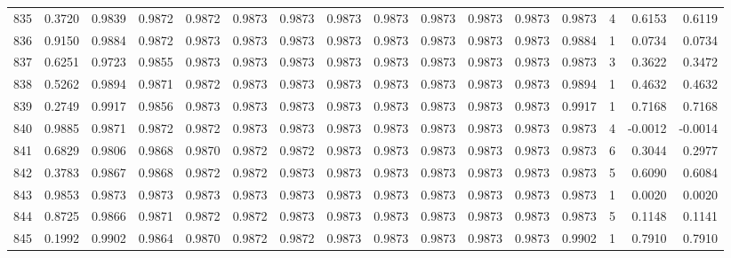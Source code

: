 \begin{tabular}{lrrrrrrrrrrrrrrr}
835 &      0.3720 &  0.9839 &  0.9872 &  0.9872 &  0.9873 &  0.9873 &  0.9873 &  0.9873 &  0.9873 &  0.9873 &   0.9873 &     0.9873 &      4 &                    0.6153 &                     0.6119 \\
836 &      0.9150 &  0.9884 &  0.9872 &  0.9873 &  0.9873 &  0.9873 &  0.9873 &  0.9873 &  0.9873 &  0.9873 &   0.9873 &     0.9884 &      1 &                    0.0734 &                     0.0734 \\
837 &      0.6251 &  0.9723 &  0.9855 &  0.9873 &  0.9873 &  0.9873 &  0.9873 &  0.9873 &  0.9873 &  0.9873 &   0.9873 &     0.9873 &      3 &                    0.3622 &                     0.3472 \\
838 &      0.5262 &  0.9894 &  0.9871 &  0.9872 &  0.9873 &  0.9873 &  0.9873 &  0.9873 &  0.9873 &  0.9873 &   0.9873 &     0.9894 &      1 &                    0.4632 &                     0.4632 \\
839 &      0.2749 &  0.9917 &  0.9856 &  0.9873 &  0.9873 &  0.9873 &  0.9873 &  0.9873 &  0.9873 &  0.9873 &   0.9873 &     0.9917 &      1 &                    0.7168 &                     0.7168 \\
840 &      0.9885 &  0.9871 &  0.9872 &  0.9872 &  0.9873 &  0.9873 &  0.9873 &  0.9873 &  0.9873 &  0.9873 &   0.9873 &     0.9873 &      4 &                   -0.0012 &                    -0.0014 \\
841 &      0.6829 &  0.9806 &  0.9868 &  0.9870 &  0.9872 &  0.9872 &  0.9873 &  0.9873 &  0.9873 &  0.9873 &   0.9873 &     0.9873 &      6 &                    0.3044 &                     0.2977 \\
842 &      0.3783 &  0.9867 &  0.9868 &  0.9872 &  0.9872 &  0.9873 &  0.9873 &  0.9873 &  0.9873 &  0.9873 &   0.9873 &     0.9873 &      5 &                    0.6090 &                     0.6084 \\
843 &      0.9853 &  0.9873 &  0.9873 &  0.9873 &  0.9873 &  0.9873 &  0.9873 &  0.9873 &  0.9873 &  0.9873 &   0.9873 &     0.9873 &      1 &                    0.0020 &                     0.0020 \\
844 &      0.8725 &  0.9866 &  0.9871 &  0.9872 &  0.9872 &  0.9873 &  0.9873 &  0.9873 &  0.9873 &  0.9873 &   0.9873 &     0.9873 &      5 &                    0.1148 &                     0.1141 \\
845 &      0.1992 &  0.9902 &  0.9864 &  0.9870 &  0.9872 &  0.9872 &  0.9873 &  0.9873 &  0.9873 &  0.9873 &   0.9873 &     0.9902 &      1 &                    0.7910 &                     0.7910 \\

\end{tabular}
